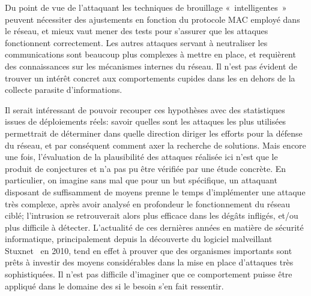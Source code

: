Du point de vue de l'attaquant les techniques de brouillage « intelligentes » peuvent nécessiter des ajustements en fonction du protocole MAC employé dans le réseau, et mieux vaut mener des tests pour s'assurer que les attaques fonctionnent correctement.
Les autres attaques servant à neutraliser les communications sont beaucoup plus complexes à mettre en place, et requièrent des connaissances sur les mécanismes internes du réseau.
Il n'est pas évident de trouver un intérêt concret aux comportements cupides dans les \rcs en dehors de la collecte parasite d'informations.

Il serait intéressant de pouvoir recouper ces hypothèses avec des statistiques issues de déploiements réels: savoir quelles sont les attaques les plus utilisées permettrait de déterminer dans quelle direction diriger les efforts pour la défense du réseau, et par conséquent comment axer la recherche de solutions.
Mais encore une fois, l'évaluation de la plausibilité des attaques réalisée ici n'est que le produit de conjectures et n'a pas pu être vérifiée par une étude concrète.
En particulier, on imagine sans mal que pour un but spécifique, un attaquant disposant de suffisamment de moyens prenne le temps d'implémenter une attaque très complexe, après avoir analysé en profondeur le fonctionnement du réseau ciblé; l'intrusion se retrouverait alors plus efficace dans les dégâts infligés, et/ou plus difficile à détecter.
L'actualité de ces dernières années en matière de sécurité informatique, principalement depuis la découverte du logiciel malveillant Stuxnet~\cite{stuxnet} en 2010, tend en effet à prouver que des organismes importants sont prêts à investir des moyens considérables dans la mise en place d'attaques très sophistiquées.
Il n'est pas difficile d'imaginer que ce comportement puisse être appliqué dans le domaine des \rcs si le besoin s'en fait ressentir.
